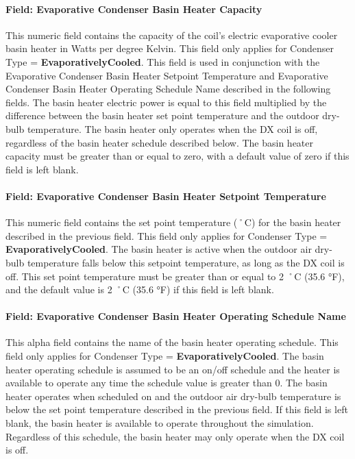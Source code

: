 \paragraph{Field: Evaporative Condenser Basin Heater Capacity}\label{field-evaporative-condenser-basin-heater-capacity-000}

This numeric field contains the capacity of the coil's electric evaporative cooler basin heater in Watts per degree Kelvin. This field only applies for Condenser Type = \textbf{EvaporativelyCooled}. This field is used in conjunction with the Evaporative Condenser Basin Heater Setpoint Temperature and Evaporative Condenser Basin Heater Operating Schedule Name described in the following fields. The basin heater electric power is equal to this field multiplied by the difference between the basin heater set point temperature and the outdoor dry-bulb temperature. The basin heater only operates when the DX coil is off, regardless of the basin heater schedule described below. The basin heater capacity must be greater than or equal to zero, with a default value of zero if this field is left blank.

\paragraph{Field: Evaporative Condenser Basin Heater Setpoint Temperature}\label{field-evaporative-condenser-basin-heater-setpoint-temperature-000}

This numeric field contains the set point temperature (˚C) for the basin heater described in the previous field. This field only applies for Condenser Type = \textbf{EvaporativelyCooled}. The basin heater is active when the outdoor air dry-bulb temperature falls below this setpoint temperature, as long as the DX coil is off. This set point temperature must be greater than or equal to 2 ˚C (35.6 °F), and the default value is 2 ˚C (35.6 °F) if this field is left blank.

\paragraph{Field: Evaporative Condenser Basin Heater Operating Schedule Name}\label{field-evaporative-condenser-basin-heater-operating-schedule-name-000}

This alpha field contains the name of the basin heater operating schedule. This field only applies for Condenser Type = \textbf{EvaporativelyCooled}. The basin heater operating schedule is assumed to be an on/off schedule and the heater is available to operate any time the schedule value is greater than 0. The basin heater operates when scheduled on and the outdoor air dry-bulb temperature is below the set point temperature described in the previous field. If this field is left blank, the basin heater is available to operate throughout the simulation. Regardless of this schedule, the basin heater may only operate when the DX coil is off.


